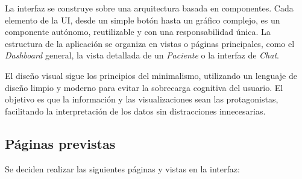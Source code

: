 La interfaz se construye sobre una arquitectura basada en componentes. Cada elemento de la UI, desde un simple botón hasta un gráfico complejo, es un componente autónomo, reutilizable y con una responsabilidad única. La estructura de la aplicación se organiza en vistas o páginas principales, como el \textit{Dashboard} general, la vista detallada de un \textit{Paciente} o la interfaz de \textit{Chat}.

El diseño visual sigue los principios del minimalismo, utilizando un lenguaje de diseño limpio y moderno para evitar la sobrecarga cognitiva del usuario. El objetivo es que la información y las visualizaciones sean las protagonistas, facilitando la interpretación de los datos sin distracciones innecesarias.



\subsection{Páginas previstas}

Se deciden realizar las siguientes páginas y vistas en la interfaz:

